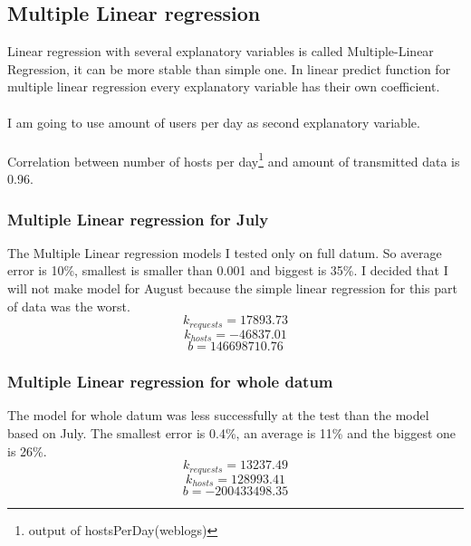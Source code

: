 \documentclass[english]{article}
\begin{document}
\subsection{Multiple Linear regression}
Linear regression with several explanatory variables is called Multiple-Linear Regression, it can be more stable than simple one. In linear predict function for multiple linear regression every explanatory variable has their own coefficient.\\\\
I am going to use amount of users per day as second explanatory variable.\\\\
Correlation between number of hosts per day\footnote{output of hostsPerDay(weblogs)} and amount of transmitted data is 0.96.
\subsubsection{Multiple Linear regression for July}

The Multiple Linear regression models I tested only on full datum. So average error is 10\%, smallest is smaller than 0.001 and biggest is 35\%. 
I decided that I will not make model for August because the simple linear regression for this part of data was the worst.
$$k_{requests}=17893.73$$$$ k_{hosts}=-46837.01$$$$b=146698710.76$$
\subsubsection{Multiple Linear regression for whole datum} 
The model for whole datum was less successfully at the test than the model based on July. The smallest error is 0.4\%, an average is 11\% and the biggest one is 26\%.
$$k_{requests}=13237.49$$$$ k_{hosts}=128993.41$$$$b=-200433498.35$$
\end{document}
